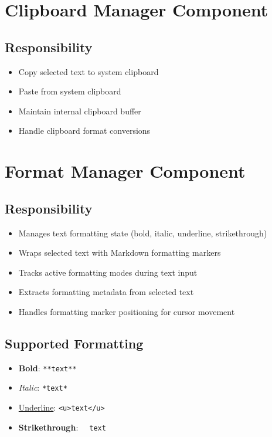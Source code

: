 \documentclass[12pt,a4paper,oneside,openany]{report}
\begin{document}
\section{Clipboard Manager Component}

\subsection{Responsibility}

\begin{itemize}
	\item Copy selected text to system clipboard
	\item Paste from system clipboard
	\item Maintain internal clipboard buffer
	\item Handle clipboard format conversions
\end{itemize}

\section{Format Manager Component}

\subsection{Responsibility}

\begin{itemize}
	\item Manages text formatting state (bold, italic, underline, strikethrough)
	\item Wraps selected text with Markdown formatting markers
	\item Tracks active formatting modes during text input
	\item Extracts formatting metadata from selected text
	\item Handles formatting marker positioning for cursor movement
\end{itemize}

\subsection{Supported Formatting}

\begin{itemize}
	\item \textbf{Bold}: \texttt{**text**}
	\item \textit{Italic}: \texttt{*text*}
	\item \underline{Underline}: \texttt{<u>text</u>}
	\item \textbf{Strikethrough}: \texttt{~~text~~}
\end{itemize}
\end{document}
